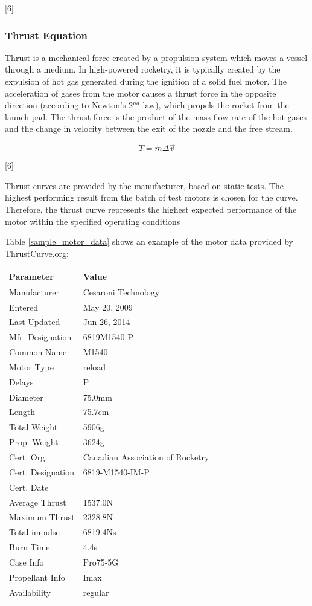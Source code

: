 \documentclass[]{book}
\begin{document}
{[}6{]}

\subsubsection{Thrust Equation}\label{thrust-equation}

Thrust is a mechanical force created by a propulsion system which moves
a vessel through a medium. In high-powered rocketry, it is typically
created by the expulsion of hot gas generated during the ignition of a
solid fuel motor. The acceleration of gases from the motor causes a
thrust force in the opposite direction (according to Newton's 2\(^{nd}\)
law), which propels the rocket from the launch pad. The thrust force is
the product of the mass flow rate of the hot gases and the change in
velocity between the exit of the nozzle and the free stream.

\begin{equation} 
T = \dot{m} \Delta \vec{v} 
\end{equation}

{[}6{]}

Thrust curves are provided by the manufacturer, based on static tests.
The highest performing result from the batch of test motors is chosen
for the curve. Therefore, the thrust curve represents the highest
expected performance of the motor within the specified operating
conditions

Table \ref{sample_motor_data} shows an example of the motor data
provided by ThrustCurve.org:

\begin{longtable}[c]{@{}ll@{}}
\toprule
Parameter & Value\tabularnewline
\midrule
\endhead
Manufacturer & Cesaroni Technology\tabularnewline
Entered & May 20, 2009\tabularnewline
Last Updated & Jun 26, 2014\tabularnewline
Mfr. Designation & 6819M1540-P\tabularnewline
Common Name & M1540\tabularnewline
Motor Type & reload\tabularnewline
Delays & P\tabularnewline
Diameter & 75.0mm\tabularnewline
Length & 75.7cm\tabularnewline
Total Weight & 5906g\tabularnewline
Prop. Weight & 3624g\tabularnewline
Cert. Org. & Canadian Association of Rocketry\tabularnewline
Cert. Designation & 6819-M1540-IM-P\tabularnewline
Cert. Date &\tabularnewline
Average Thrust & 1537.0N\tabularnewline
Maximum Thrust & 2328.8N\tabularnewline
Total impulse & 6819.4Ns\tabularnewline
Burn Time & 4.4s\tabularnewline
Case Info & Pro75-5G\tabularnewline
Propellant Info & Imax\tabularnewline
Availability & regular\tabularnewline
\bottomrule
\end{longtable}
\end{document}

